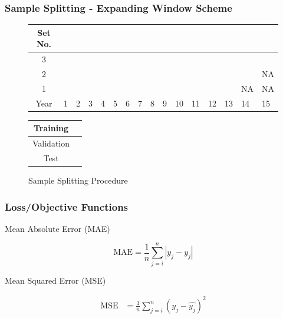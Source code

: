 \documentclass[aspectratio=169]{beamer}
\begin{document}
\begin{frame}
\frametitle{Sample Splitting - Expanding Window Scheme}
\begin{figure}
	\begin{center}
		\begin{tabular}{|c|p{0.40cm}p{0.40cm}p{0.40cm}p{0.40cm}p{0.40cm}p{0.40cm}p{0.40cm}p{0.40cm}p{0.40cm}p{0.40cm}p{0.40cm}p{0.40cm}p{0.40cm}p{0.40cm}p{0.40cm}|}
			\hline
			Set No. &&&&&&&&&&&&&&& \\
			\hline
			3 & \cellcolor{cyan} & \cellcolor{cyan} & \cellcolor{cyan} & \cellcolor{cyan} & \cellcolor{cyan} & \cellcolor{cyan} & \cellcolor{cyan} & \cellcolor{cyan} & \cellcolor{cyan} &
			\cellcolor{pink} & \cellcolor{pink} & \cellcolor{pink} & \cellcolor{pink} & \cellcolor{pink} & 	
			\cellcolor{olive} \\
			2 & \cellcolor{cyan} & \cellcolor{cyan} & \cellcolor{cyan} & \cellcolor{cyan} & \cellcolor{cyan} & \cellcolor{cyan} & \cellcolor{cyan} & \cellcolor{cyan} &
			\cellcolor{pink} & \cellcolor{pink} & \cellcolor{pink} & \cellcolor{pink} & \cellcolor{pink} & 	
			\cellcolor{olive} & NA  \\
			1 & \cellcolor{cyan} & \cellcolor{cyan} & \cellcolor{cyan} & \cellcolor{cyan} & \cellcolor{cyan} & \cellcolor{cyan} & \cellcolor{cyan} &
			\cellcolor{pink} & \cellcolor{pink} & \cellcolor{pink} & \cellcolor{pink} & \cellcolor{pink} & 	
			\cellcolor{olive} & NA & NA \\
			\hline
			Year & 1 & 2 & 3 & 4 & 5 & 6 & 7 & 8 & 9 & 10 & 11 & 12 & 13 & 14 & 15\\
			\hline
		\end{tabular}
		\medskip
		\begin{tabular}{|c|p{0.40cm}|}
			\hline
			Training & \cellcolor{cyan} \\
			\hline
			Validation & \cellcolor{pink} \\
			\hline
			Test & \cellcolor{olive} \\
			\hline
		\end{tabular}
	\end{center}
	\caption{Sample Splitting Procedure}
	\label{sample_split_diag}
\end{figure}
\end{frame}


\begin{frame}
\frametitle{Loss/Objective Functions}
Mean Absolute Error (MAE)

	\begin{equation}
	\text{MAE} = \frac{1}{n} \sum_{j = i}^{n} |y_j - \hat{y_j}|
	\end{equation}
	
Mean Squared Error (MSE)

	\begin{align}
	\text{MSE} &= \frac{1}{n} \sum_{j = i}^{n} \left( y_j - \hat{y_j}\right) ^2
	\end{align}

\end{frame}
\end{document}
